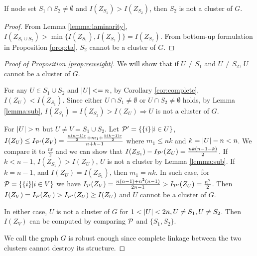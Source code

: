 \documentclass{article}
\begin{document}

\begin{lemma}\label{lemma:sub}
	If node set $S_1 \cap S_2 \neq \emptyset$ and $I(Z_{S_1}) > I(Z_{S_2})$, then $S_2$ is not a cluster of $G$.
\end{lemma}
\begin{proof}
	From Lemma \ref{lemma:laminarity},
	$I(Z_{S_1\cup S_2}) > \min\{I(Z_{S_1}), I(Z_{S_2})\} = I(Z_{S_2})$. From bottom-up formulation in Proposition \ref{prop:ta},  $S_2$ cannot be a cluster of $G$.
\end{proof}
\begin{proof}[Proof of Proposition \ref{prop:reweight}]
	We will show that if $U \neq S_1$ and $U \neq S_2$, $U$ cannot be a cluster of $G$.
	
For any $U \in S_1 \cup S_2 $ and $\abs{U} <= n$, by Corollary \ref{cor:complete}, $I(Z_U) < I(Z_{S_1})$.
Since either $U \cap S_1 \neq \emptyset$ or $U \cap S_2 \neq \emptyset$ holds, by Lemma \ref{lemma:sub}, $I(Z_{S_1})= I(Z_{S_2}) > I(Z_U) \Rightarrow U$ is not a cluster of $G$.

For $\abs{U} > n$ but $U \neq V = S_1 \cup S_2$. Let $\P' = \{\{i\}| i\in U\}$, $I(Z_U) \leq I_{\P'}(Z_V) = \frac{\frac{n(n-1)r}{2} + m_1 + \frac{k(k-1)r}{2}}{n+k-1}$ where $m_1 \leq nk$ and $k=\abs{U} - n < n$. 
We compare it to $\frac{nr}{2}$ and we can show that $I(Z_{S_1}) - I_{\P'}(Z_U) = \frac{nk(n-1-k)}{2}$. If $k<n-1$, $I(Z_{S_1})>I(Z_U)$, $U$ is not a cluster by Lemma \ref{lemma:sub}. If $k=n-1$, and $I(Z_U) = I(Z_{S_1})$, then $m_1=nk$. In such case, for $\P=\{\{i\}|i\in V\}$ we have $I_{\P}(Z_V) = \frac{n(n-1)+n^2(n-1)}{2n-1} > I_{\P'}(Z_U)=\frac{n^2}{2}$. Then $I(Z_V) = I_{\P}(Z_V) > I_{\P'}(Z_U) \geq I(Z_U)$ and $U$ cannot be a cluster of $G$.

 In either case, $U$ is not a cluster of $G$ for $1<\abs{U}<2n, U \neq S_1, U\neq S_2$. Then $I(Z_V)$ can be computed by comparing $\P$ and $\{S_1, S_2\}$.

We call the graph $G$ is robust enough since complete linkage between the two clusters cannot destroy its structure.	
\end{proof}
\end{document}
